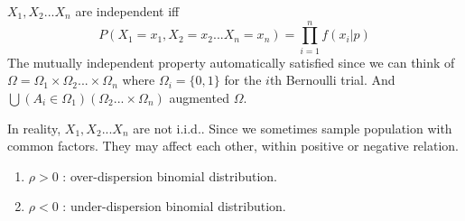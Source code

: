 \documentclass[../Distributions.tex]{subfiles}
\begin{document}
\begin{intuition}[Independent]
$X_1,X_2...X_n$ are independent iff $$P(X_1=x_1,X_2=x_2...X_n=x_n)=\prod_{i=1}^nf(x_i|p)$$
The mutually independent property automatically satisfied since we can think of $\Omega=\Omega_1\times\Omega_2...\times\Omega_n$ where $\Omega_i=\{0,1\}$ for the $i$th Bernoulli trial. And $\bigcup(A_i\in\Omega_1)(\Omega_2...\times\Omega_n)$ augmented $\Omega$.
\end{intuition}
\begin{remark}In reality, $X_1,X_2...X_n$ are not i.i.d.. Since we sometimes sample population with common factors. They may affect each other, within positive or negative relation.
\begin{enumerate}
\item $\rho>0$ : over-dispersion binomial distribution.
\item $\rho<0$ : under-dispersion binomial distribution.
\end{enumerate}
\end{remark}
\end{document}

